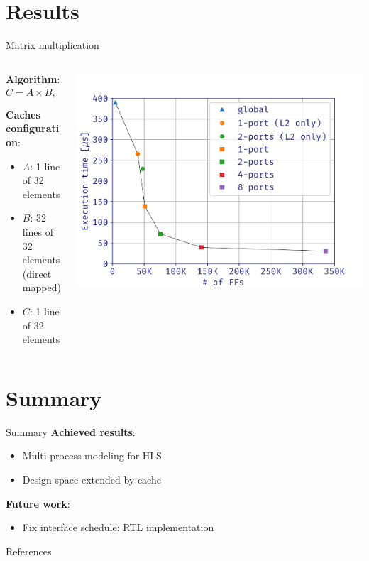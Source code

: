 \documentclass[aspectratio=169]{beamer}
\begin{document}
\section{Results}
\begin{frame}{Matrix multiplication}
	\begin{columns}
		\begin{column}{.5\textwidth}
			\textbf{Algorithm}:
			\[C = A \times B, \quad A, B, C \in \mathbb{R}^{32 \times 32}\]

			\textbf{Caches configuration}:
			\begin{itemize}
				\item $A$: 1 line of 32 elements
				\item $B$: 32 lines of 32 elements\\(direct mapped)
				\item $C$: 1 line of 32 elements
			\end{itemize}
		\end{column}
		\begin{column}{.5\textwidth}
			\begin{center}
				\includegraphics[width=\textwidth]{plot}
			\end{center}
		\end{column}
	\end{columns}
\end{frame}

\section{Summary}
\begin{frame}{Summary}
	\textbf{Achieved results}:
	\begin{itemize}
		\item Multi-process modeling for HLS
		\item Design space extended by cache
	\end{itemize}

	\bigskip
	\textbf{Future work}:
	\begin{itemize}
		\item Fix interface schedule: RTL implementation
	\end{itemize}
\end{frame}

\begin{frame}{References}
	\nocite{*}
	\printbibliography[heading=none]
\end{frame}
\end{document}
